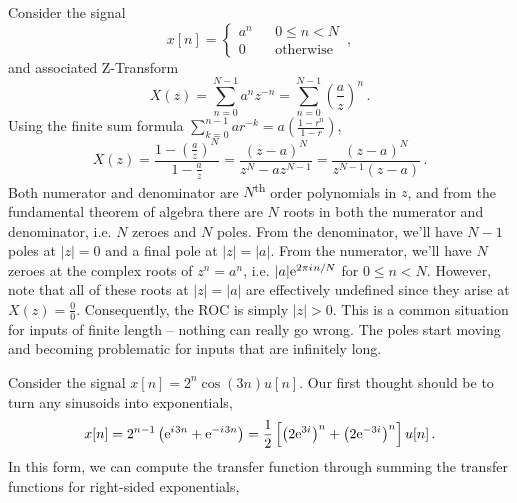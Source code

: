 \begin{exmp}
  Consider the signal
  \begin{displaymath}
    x[n] = \left\{\begin{array}{ccl}
    a^n & & 0 \leq n < N \\
    0 & & \mathrm{otherwise}
    \end{array}\right. \,,
  \end{displaymath}
  and associated Z-Transform
  \begin{displaymath}
    X(z) = \sum_{n=0}^{N-1}a^n z^{-n} = \sum_{n=0}^{N-1}\left(\frac{a}{z}\right)^n \,.
  \end{displaymath}
  Using the finite sum formula $\sum_{k=0}^{n-1}ar^{-k} = a\left(\frac{1-r^n}{1 - r}\right)$,
  \begin{displaymath}
    X(z) = \frac{1 - \left(\frac{a}{z}\right)^N}{1 - \frac{a}{z}} = \frac{(z-a)^N}{z^N - az^{N-1}}
    = \frac{(z-a)^N}{z^{N-1}(z-a)} \,.
  \end{displaymath}
  Both numerator and denominator are $N$\textsuperscript{th} order polynomials in
  $z$, and from the fundamental theorem of algebra there are $N$ roots in
  both the numerator and denominator, i.e. $N$ zeroes and $N$ poles. From the
  denominator, we'll have $N-1$ poles at $|z|=0$ and a final pole at $|z|=|a|$.
  From the numerator, we'll have $N$ zeroes at the complex roots of $z^n = a^n$,
  i.e. $|a|\mathrm{e}^{2\pi {i\mkern1mu} n / N}$ for $0\leq n < N$. However, note that all of
  these roots at $|z| = |a|$ are effectively undefined since they arise at
  $X(z) = \frac{0}{0}$. Consequently, the ROC is simply $|z| > 0$. This is a
  common situation for inputs of finite length -- nothing can really go wrong.
  The poles start moving and becoming problematic for inputs that are
  infinitely long.
\end{exmp}
%
\begin{exmp}
  Consider the signal $x[n] = 2^n\cos(3n)u[n]$. Our first thought should be
  to turn any sinusoids into exponentials,
  \begin{displaymath}
    x[n] = 2^{n-1}\left(\mathrm{e}^{{i\mkern1mu} 3n} + \mathrm{e}^{-{i\mkern1mu} 3n}\right) = \frac{1}{2}\left[
      \left(2\mathrm{e}^{3{i\mkern1mu}}\right)^n + \left(2\mathrm{e}^{-3{i\mkern1mu}}\right)^n 
    \right] u[n] \,.
  \end{displaymath}
  In this form, we can compute the transfer function through summing
  the transfer functions for right-sided exponentials,
  \begin{displaymath}

  \end{displaymath}
\end{exmp}
